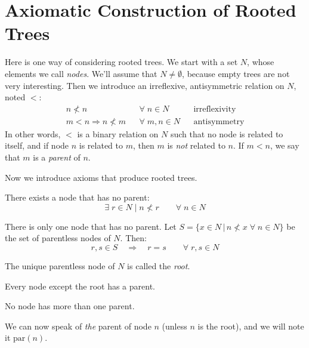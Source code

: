 \chapter{Axiomatic Construction of Rooted Trees}

Here is one way of considering rooted trees. We start with a set $N$, whose
elements we call \emph{nodes}.  We'll assume that $N \neq \emptyset$, because
empty trees are not very interesting. Then we introduce an irreflexive,
antisymmetric relation on $N$, noted $<$:
\begin{align}
n \nless n & & \forall \; n \in N & & \text{irreflexivity} \\
m < n \Rightarrow n \nless m &  & \forall \; m, n \in N & &  \text{antisymmetry}
\end{align}
In other words, $<$ is a binary relation on $N$ such that no node is
related to itself, and if node $n$ is related to $m$, then $m$ is \emph{not}
related to $n$. If $m < n$, we say that $m$ is a \emph{parent} of $n$.

Now we introduce axioms that produce rooted trees.
\begin{axiom}
There exists a node that has no parent:
\[ \exists \; r \in N \; | \; n \nless r \qquad \forall \; n \in N \]
\end{axiom}

\begin{axiom}
There is only one node that has no parent. Let $S = \{x \in N\,|\, n \nless x \; \forall \; n \in N \}$ be the set of parentless nodes of $N$. Then:
\[ r, s \in S \quad \Rightarrow \quad r = s \qquad \forall \;r, s \in N \]
\end{axiom} 

The unique parentless node of $N$ is called the \emph{root}.

\begin{axiom}
Every node except the root has a parent.
\end{axiom} 

\begin{axiom}
No node has more than one parent.
\end{axiom} 

We can now speak of \emph{the} parent of node $n$ (unless $n$ is the root), and we will note it $\mathrm{par}(n)$.

